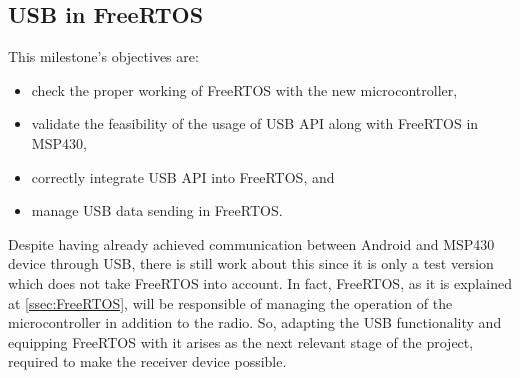	\subsection{USB in FreeRTOS}
	\label{ssec:USB.FreeRTOS}	
		This milestone's objectives are:
		\begin{itemize}
			\item check the proper working of FreeRTOS with the new microcontroller,
			\item validate the feasibility of the usage of USB API along with FreeRTOS in MSP430,
			\item correctly integrate USB API into FreeRTOS, and
			\item manage USB data sending in FreeRTOS.
		\end{itemize}

		Despite having already achieved communication between Android and MSP430 device through USB, there is
		still work about this since it is only a test version which does not take FreeRTOS into account. In fact,
		FreeRTOS, as it is explained at \autoref{ssec:FreeRTOS}, will be responsible of managing the operation of
		the microcontroller in addition to the radio. So, adapting the USB functionality and equipping FreeRTOS
		with it arises as the next relevant stage of the project, required to make the receiver device possible.\\

